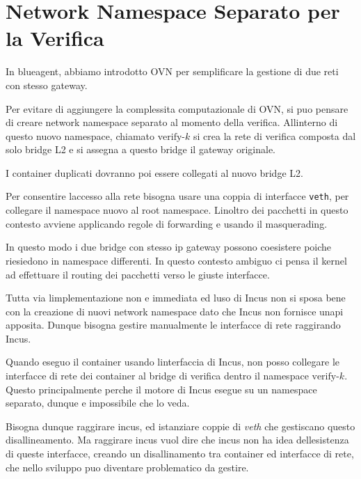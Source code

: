 \section{Network Namespace Separato per la
Verifica}\label{network-namespace-separato-per-la-verifica}

In blueagent, abbiamo introdotto OVN per semplificare la gestione di due
reti con stesso gateway.

Per evitare di aggiungere la complessita computazionale di OVN, si
puo\textquotesingle{} pensare di creare network namespace separato al
momento della verifica. All\textquotesingle interno di questo nuovo
namespace, chiamato \(\text{verify-}k\) si crea la rete di verifica
composta dal solo bridge L2 e si assegna a questo bridge il gateway
originale.

I container duplicati dovranno poi essere collegati al nuovo bridge L2.

Per consentire l\textquotesingle accesso alla rete bisogna usare una
coppia di interfacce \passthrough{\lstinline!veth!}, per collegare il
namespace nuovo al root namespace. L\textquotesingle inoltro dei
pacchetti in questo contesto avviene applicando regole di forwarding e
usando il masquerading.

In questo modo i due bridge con stesso ip gateway possono coesistere
poiche riesiedono in namespace differenti. In questo contesto ambiguo ci
pensa il kernel ad effettuare il routing dei pacchetti verso le giuste
interfacce.

Tutta via l\textquotesingle implementazione non e\textquotesingle{}
immediata ed l\textquotesingle uso di Incus non si sposa bene con la
creazione di nuovi network namespace dato che Incus non fornisce
un\textquotesingle api apposita. Dunque bisogna gestire manualmente le
interfacce di rete raggirando Incus.

Quando eseguo il container usando l\textquotesingle interfaccia di
Incus, non posso collegare le interfacce di rete dei container al bridge
di verifica dentro il namespace \(\text{verify-}k\). Questo
principalmente perche\textquotesingle{} il motore di Incus esegue su un
namespace separato, dunque e\textquotesingle{} impossibile che lo veda.

Bisogna dunque raggirare incus, ed istanziare coppie di \emph{veth} che
gestiscano questo disallineamento. Ma raggirare incus vuol dire che
incus non ha idea dell\textquotesingle esistenza di queste interfacce,
creando un disallinamento tra container ed interfacce di rete, che nello
sviluppo puo\textquotesingle{} diventare problematico da gestire.

